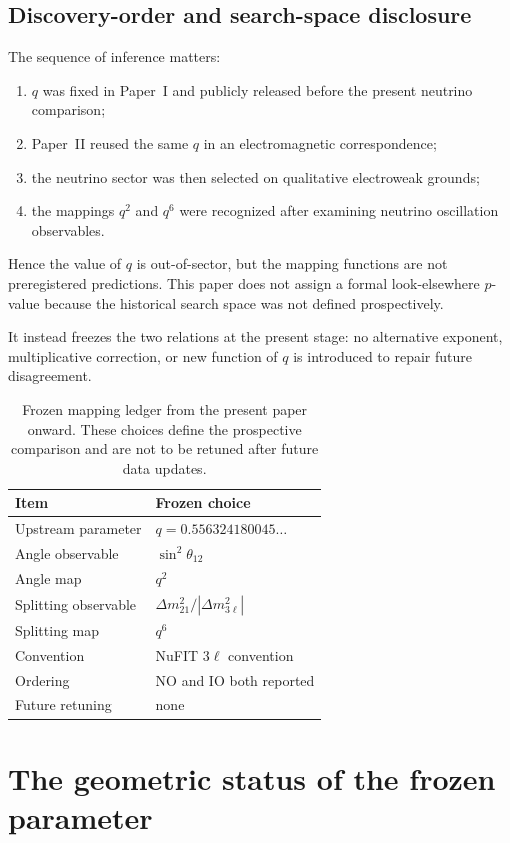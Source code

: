 \documentclass[10pt,twocolumn]{article}
\begin{document}
\subsection{Discovery-order and search-space disclosure}

The sequence of inference matters:
\begin{enumerate}
\item $q$ was fixed in Paper~I and publicly released before the present neutrino
comparison;
\item Paper~II reused the same $q$ in an electromagnetic correspondence;
\item the neutrino sector was then selected on qualitative electroweak grounds;
\item the mappings $q^2$ and $q^6$ were recognized after examining neutrino
oscillation observables.
\end{enumerate}
Hence the value of $q$ is out-of-sector, but the mapping functions are not
preregistered predictions.  This paper does not assign a formal look-elsewhere
$p$-value because the historical search space was not defined prospectively.

It instead freezes the two relations at the present stage: no alternative
exponent, multiplicative correction, or new function of $q$ is introduced to
repair future disagreement.

\begin{table}[t]
\centering
\caption{Frozen mapping ledger from the present paper onward.  These choices define
the prospective comparison and are not to be retuned after future data updates.}
\label{tab:ledger}
\begin{tabular}{@{}p{2.65cm}p{4.35cm}@{}}
\toprule
Item & Frozen choice\\
\midrule
Upstream parameter & $q=0.556324180045\ldots$\\
Angle observable & $\sin^2\theta_{12}$\\
Angle map & $q^2$\\
Splitting observable & $\Delta m^2_{21}/|\Delta m^2_{3\ell}|$\\
Splitting map & $q^6$\\
Convention & NuFIT $3\ell$ convention\\
Ordering & NO and IO both reported\\
Future retuning & none\\
\bottomrule
\end{tabular}
\end{table}

\section{The geometric status of the frozen parameter}
\label{sec:geometry}
\end{document}
